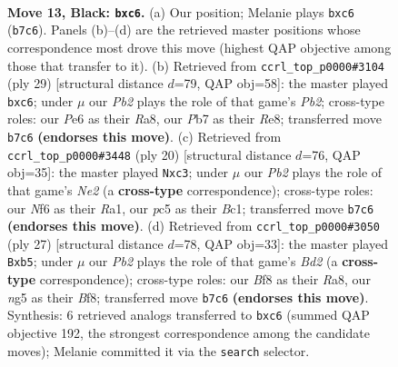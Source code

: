 \documentclass[11pt]{article}
\begin{document}
\clearpage

\begin{figure}[p]\centering
\begin{subfigure}{0.46\textwidth}\centering
\resizebox{\linewidth}{!}{%
\newchessgame
\chessboard[
  setfen={r1b2b1r/1p2kppp/2B1pn2/p1P3N1/7P/4P3/PP3P2/RNBR2K1 b - - 0 13},
  showmover=false,
  pgfstyle=straightmove, color=movearrow, markmove={b7-c6}
]}
\caption{}
\end{subfigure}\hfill
\begin{subfigure}{0.46\textwidth}\centering
\resizebox{\linewidth}{!}{%
\newchessgame
\chessboard[
  setfen={r1b1r2k/ppp3bp/2B3p1/4ppN1/2P5/1PB3P1/P3PP1P/2R1K2R b K - 0 15},
  showmover=false,
  pgfstyle=straightmove, color=movearrow, markmove={b7-c6}
]}
\caption{}
\end{subfigure}
\\[4pt]
\begin{subfigure}{0.46\textwidth}\centering
\resizebox{\linewidth}{!}{%
\newchessgame
\chessboard[
  setfen={rnbk1b1r/1p3ppp/p3p3/8/6P1/2n4P/PPP1NP2/R1B1KB1R w KQ - 0 11},
  showmover=false,
  pgfstyle=straightmove, color=movearrow, markmove={e2-c3}
]}
\caption{}
\end{subfigure}\hfill
\begin{subfigure}{0.46\textwidth}\centering
\resizebox{\linewidth}{!}{%
\newchessgame
\chessboard[
  setfen={r3kb1r/pp1bpp2/6p1/nB5p/8/2P1N3/P2P1PPP/1RB1K2R b Kkq - 3 14},
  showmover=false,
  pgfstyle=straightmove, color=movearrow, markmove={d7-b5}
]}
\caption{}
\end{subfigure}
\caption{\textbf{Move 13, Black: \texttt{bxc6}.} (a) Our position; Melanie plays \texttt{bxc6} (\texttt{b7c6}). Panels (b)--(d) are the retrieved master positions whose correspondence most drove this move (highest QAP objective among those that transfer to it). (b) Retrieved from \texttt{ccrl\_top\_p0000\#3104} (ply 29) [structural distance $d$=79, QAP obj=58]: the master played \texttt{bxc6}; under $\mu$ our \emph{Pb2} plays the role of that game's \emph{Pb2}; cross-type roles: our \emph{P}e6 as their \emph{R}a8, our \emph{P}b7 as their \emph{R}e8; transferred move \texttt{b7c6} \textbf{(endorses this move)}. (c) Retrieved from \texttt{ccrl\_top\_p0000\#3448} (ply 20) [structural distance $d$=76, QAP obj=35]: the master played \texttt{Nxc3}; under $\mu$ our \emph{Pb2} plays the role of that game's \emph{Ne2} (a \textbf{cross-type} correspondence); cross-type roles: our \emph{N}f6 as their \emph{R}a1, our \emph{p}c5 as their \emph{B}c1; transferred move \texttt{b7c6} \textbf{(endorses this move)}. (d) Retrieved from \texttt{ccrl\_top\_p0000\#3050} (ply 27) [structural distance $d$=78, QAP obj=33]: the master played \texttt{Bxb5}; under $\mu$ our \emph{Pb2} plays the role of that game's \emph{Bd2} (a \textbf{cross-type} correspondence); cross-type roles: our \emph{B}f8 as their \emph{R}a8, our \emph{n}g5 as their \emph{B}f8; transferred move \texttt{b7c6} \textbf{(endorses this move)}. Synthesis: 6 retrieved analogs transferred to \texttt{bxc6} (summed QAP objective 192, the strongest correspondence among the candidate moves); Melanie committed it via the \texttt{search} selector.}
\label{fig:thought-m25}
\end{figure}
\end{document}
